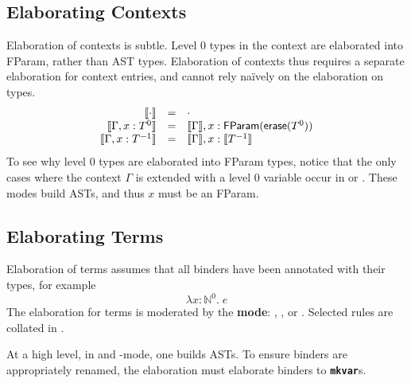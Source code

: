\subsection{Elaborating Contexts}
Elaboration of contexts is subtle. Level $0$ types in the context are elaborated into \textsf{FParam}, rather than \textsf{AST} types. Elaboration of contexts thus requires a separate elaboration for context entries, and cannot rely naïvely on the elaboration on types.
\[
\begin{array}{rcl}
  \llbracket \cdot \rrbracket & = & \cdot \\
  \llbracket \Gamma, x:T^0 \rrbracket & = & \llbracket \Gamma \rrbracket, x: \textsf{FParam}(\textsf{erase}(T^0))\\
  \llbracket \Gamma, x:T^{-1} \rrbracket & = & \llbracket \Gamma \rrbracket, x: \llbracket T^{-1} \rrbracket
\end{array}
\]
To see why level $0$ types are elaborated into \textsf{FParam} types, notice that the only cases where the context $\Gamma$ is extended with a level $0$ variable occur in \compilemode{} or \quotemode{}. These modes build ASTs, and thus $x$ must be an \textsf{FParam}. 

\subsection{Elaborating Terms}
Elaboration of terms assumes that all binders have been annotated with their types, for example 
\[\lambda x: \mathbb{N}^0. \; e\]
The elaboration for terms is moderated by the \textbf{mode}: \compilemode{}, \quotemode{}, or \splicemode{}. Selected rules are collated in . 

At a high level, in \compilemode{} and \quotemode{}-mode, one builds ASTs. To ensure binders are appropriately renamed, the elaboration must elaborate binders to \textbf{\texttt{mkvar}}s. 

